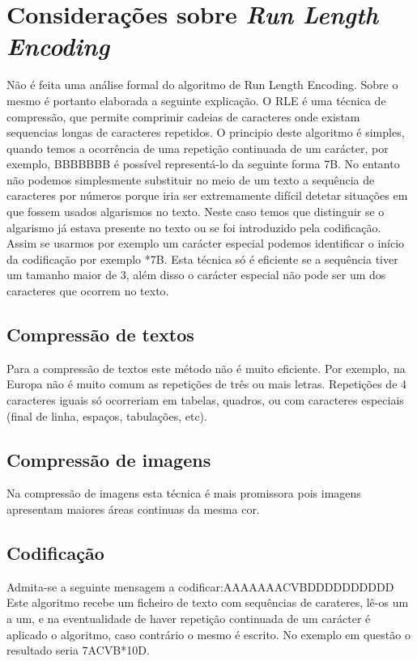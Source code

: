 \documentclass[a4paper,12pt,titlepage]{article}
\begin{document}
\section{Considerações sobre \emph{Run Length Encoding}}
Não é feita uma análise formal do algoritmo de Run Length Encoding. Sobre o mesmo é portanto elaborada a seguinte explicação.\newline
O RLE é uma técnica de compressão, que permite comprimir cadeias de caracteres onde existam sequencias longas de caracteres repetidos.\newline
O principio deste algoritmo é simples, quando temos a ocorrência de uma repetição continuada de um carácter, por exemplo, BBBBBBB é possível representá-lo da seguinte forma 7B. No entanto não podemos simplesmente substituir no meio de um texto a sequência de caracteres por números porque iria ser extremamente difícil detetar situações em que fossem usados algarismos no texto.\newline
Neste caso temos que distinguir se o algarismo já estava presente no texto ou se foi introduzido pela codificação. Assim se usarmos por exemplo um carácter especial podemos identificar o início da codificação por exemplo *7B. \newline
Esta técnica só é eficiente se a sequência tiver um tamanho maior de 3, além disso o carácter especial não pode ser um dos caracteres que ocorrem no texto.
\subsection{Compressão de textos}
Para a compressão de textos este método não é muito eficiente. Por exemplo, na Europa não é muito comum as repetições de três ou mais  letras. Repetições de 4 caracteres iguais só ocorreriam em tabelas, quadros, ou com caracteres especiais (final de linha, espaços, tabulações, etc).
\subsection{Compressão de imagens}
Na compressão de imagens esta técnica é mais promissora pois imagens apresentam maiores áreas continuas da mesma cor.
\subsection{Codificação}
Admita-se a seguinte mensagem a codificar:AAAAAAACVBDDDDDDDDDD\newline
Este algoritmo recebe um ficheiro de texto com sequências de carateres, lê-os um a um, e na eventualidade de haver repetição continuada de um carácter é aplicado o algoritmo, caso contrário o mesmo é escrito.
\newline
No exemplo em questão o resultado seria 7ACVB*10D.
\end{document}
